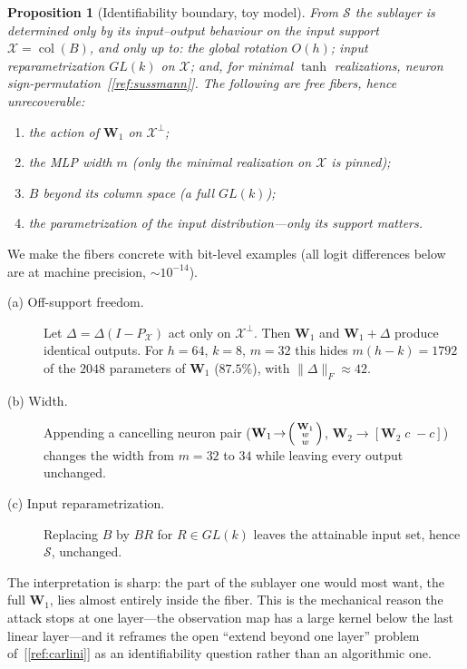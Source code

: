 \documentclass[11pt]{article}
\newtheorem{proposition}{Proposition}
\DeclareMathOperator{\col}{col}
\newcommand{\W}{\mathbf{W}}
\begin{document}
\begin{proposition}[Identifiability boundary, toy model]\label{prop:wall}
From $\mathcal{S}$ the sublayer is determined only by its input--output behaviour
on the input support $\mathcal{X}=\col(B)$, and only up to: the global rotation
$O(h)$; input reparametrization $GL(k)$ on $\mathcal{X}$; and, for minimal
$\tanh$ realizations, neuron sign-permutation~[\ref{ref:sussmann}]. The following
are free fibers, hence unrecoverable:
\begin{enumerate}
\item[\textup{(a)}] the action of $\W_1$ on $\mathcal{X}^\perp$;
\item[\textup{(b)}] the MLP width $m$ (only the minimal realization on
$\mathcal{X}$ is pinned);
\item[\textup{(c)}] $B$ beyond its column space (a full $GL(k)$);
\item[\textup{(d)}] the parametrization of the input distribution---only its
support matters.
\end{enumerate}
\end{proposition}

We make the fibers concrete with bit-level examples (all logit differences below
are at machine precision, $\sim10^{-14}$).

\begin{description}
\item[(a) Off-support freedom.] Let $\Delta=\Delta(I-P_{\mathcal{X}})$ act only on
$\mathcal{X}^\perp$. Then $\W_1$ and $\W_1+\Delta$ produce identical outputs. For
$h=64$, $k=8$, $m=32$ this hides $m(h-k)=1792$ of the $2048$ parameters of $\W_1$
($87.5\%$), with $\|\Delta\|_F\approx 42$.
\item[(b) Width.] Appending a cancelling neuron pair
($\W_1\!\to\!\begin{psmallmatrix}\W_1\\w\\w\end{psmallmatrix}$,
$\W_2\!\to\![\W_2\;c\;{-}c]$) changes the width from $m=32$ to $34$ while leaving
every output unchanged.
\item[(c) Input reparametrization.] Replacing $B$ by $BR$ for $R\in GL(k)$ leaves
the attainable input set, hence $\mathcal{S}$, unchanged.
\end{description}

The interpretation is sharp: the part of the sublayer one would most want, the
full $\W_1$, lies almost entirely inside the fiber. This is the mechanical reason
the attack stops at one layer---the observation map has a large kernel below the
last linear layer---and it reframes the open ``extend beyond one layer'' problem
of~[\ref{ref:carlini}] as an identifiability question rather than an algorithmic
one.
\end{document}
